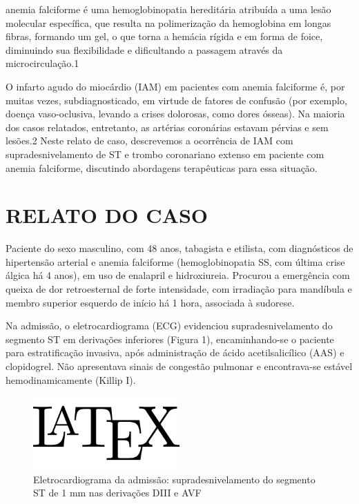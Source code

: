 \par {} anemia falciforme é uma hemoglobinopatia hereditária atribuída a uma lesão molecular específica, que resulta na polimerização da hemoglobina em longas fibras, formando um gel, o que torna a hemácia rígida e em forma de foice, diminuindo sua flexibilidade e dificultando a passagem através da microcirculação.1\par O infarto agudo do miocárdio (IAM) em pacientes com anemia falciforme é, por muitas vezes, subdiagnosticado, em virtude de fatores de confusão (por exemplo, doença vaso-oclusiva, levando a crises dolorosas, como dores ósseas). Na maioria dos casos relatados, entretanto, as artérias coronárias estavam pérvias e sem lesões.2 Neste relato de caso, descrevemos a ocorrência de IAM com supradesnivelamento de ST e trombo coronariano extenso em paciente com anemia falciforme, discutindo abordagens terapêuticas para essa situação.\section*{RELATO DO CASO}\par Paciente do sexo masculino, com 48 anos, tabagista e etilista, com diagnósticos de hipertensão arterial e anemia falciforme (hemoglobinopatia SS, com última crise álgica há 4 anos), em uso de enalapril e hidroxiureia. Procurou a emergência com queixa de dor retroesternal de forte intensidade, com irradiação para mandíbula e membro superior esquerdo de início há 1 hora, associada à sudorese.\par Na admissão, o eletrocardiograma (ECG) evidenciou supradesnivelamento do segmento ST em derivações inferiores (Figura 1), encaminhando-se o paciente para estratificação invasiva, após administração de ácido acetilsalicílico (AAS) e clopidogrel. Não apresentava sinais de congestão pulmonar e encontrava-se estável hemodinamicamente (Killip I).
\par \textbf{}
\begin{figure}[p]
	\centering
	\includegraphics[width=0.5\textwidth]{temp.png}
	\caption{Eletrocardiograma da admissão: supradesnivelamento do segmento ST de 1 mm nas derivações DIII e AVF}
	\label{Figura 1}
\end{figure}

